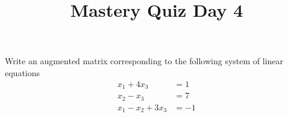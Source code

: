 \documentclass{sbgquiz}
\title{Mastery Quiz Day 4 }
\begin{document}
\begin{problem}[E1]
Write an augmented matrix corresponding to the following system of linear equations
\begin{align*}
x_1+4x_3 &= 1 \\
x_2-x_3 &= 7 \\
x_1-x_2+3x_3 &= -1
\end{align*}
\end{problem}
\end{document}
